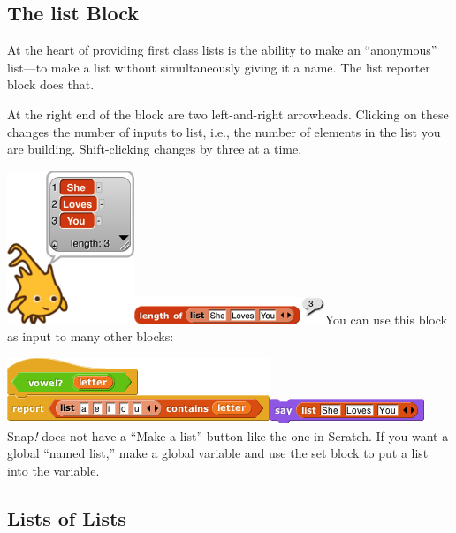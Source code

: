 \subsection{\texorpdfstring{ The list
Block}{ The list Block}}\label{the-list-block}

At the heart of providing first class lists is the ability to make an
``anonymous'' list---to make a list without simultaneously giving it a
name. The list reporter block does that.

At the right end of the block are two left-and-right arrowheads.
Clicking on these changes the number of inputs to list, i.e., the number
of elements in the list you are building. Shift-clicking changes by
three at a time.

\includegraphics[width=1.50347in,height=1.8125in]{media/image534.png}\includegraphics[width=2.24375in,height=0.32153in]{media/image535.png}You
can use this block as input to many other blocks:

\includegraphics[width=3.09375in,height=0.77083in]{media/image536.png}\includegraphics[width=1.82292in,height=0.29167in]{media/image537.png}Snap\emph{!}
does not have a ``Make a list'' button like the one in Scratch. If you
want a global ``named list,'' make a global variable and use the set
block to put a list into the variable.

\subsection{Lists of Lists}\label{lists-of-lists}

